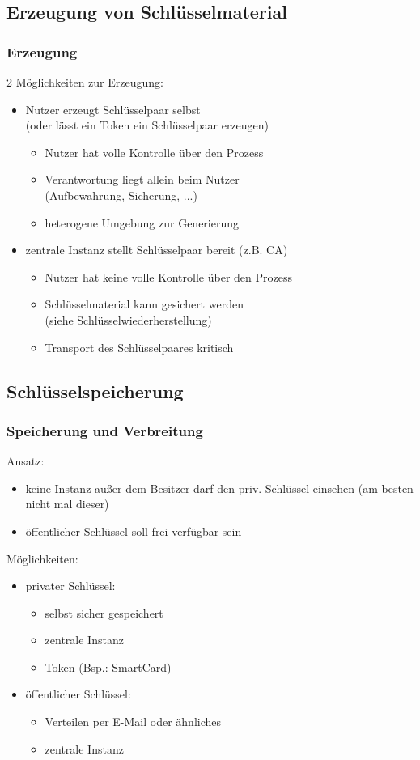 \documentclass{beamer}
\begin{document}
\subsection*{Erzeugung von Schlüsselmaterial}
\begin{frame}
\frametitle{Erzeugung}
2 Möglichkeiten zur Erzeugung:
\begin{itemize}
\item Nutzer erzeugt Schlüsselpaar selbst 
\\(oder lässt ein Token ein Schlüsselpaar erzeugen)
\begin{itemize}
\item Nutzer hat volle Kontrolle über den Prozess
\item Verantwortung liegt allein beim Nutzer
\\(Aufbewahrung, Sicherung, ...)
\item heterogene Umgebung zur Generierung
\end{itemize}
\item zentrale Instanz stellt Schlüsselpaar bereit (z.B. CA)
\begin{itemize}
\item Nutzer hat keine volle Kontrolle über den Prozess
\item Schlüsselmaterial kann gesichert werden 
\\(siehe Schlüsselwiederherstellung)
\item Transport des Schlüsselpaares kritisch
\end{itemize}
\end{itemize} 
\end{frame}
\subsection*{Schlüsselspeicherung}
\begin{frame}
\frametitle{Speicherung und Verbreitung}
Ansatz:
\begin{itemize}
\item keine Instanz außer dem Besitzer darf den priv. Schlüssel einsehen (am besten nicht mal dieser) 
\item öffentlicher Schlüssel soll frei verfügbar sein
\end{itemize}
Möglichkeiten:
\begin{itemize}
\item privater Schlüssel:
\begin{itemize}
\item selbst sicher gespeichert
\item zentrale Instanz
\item Token (Bsp.: SmartCard)
\end{itemize}
\item öffentlicher Schlüssel:
\begin{itemize}
\item Verteilen per E-Mail oder ähnliches
\item zentrale Instanz
\end{itemize}
\end{itemize}
\end{frame}
\end{document}
